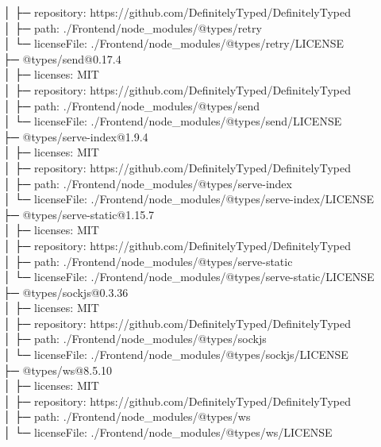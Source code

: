 \documentclass[
    paper=a4,
    twoside=false,
    parskip=half,
    listof=entryprefix,
    listof=totoc,
    index=totoc,
    bibliography=totoc,
    headsepline,
]{scrbook}
\begin{document}
    │  ├─ repository: https://github.com/DefinitelyTyped/DefinitelyTyped\\
    │  ├─ path: ./Frontend/node\_modules/@types/retry\\
    │  └─ licenseFile: ./Frontend/node\_modules/@types/retry/LICENSE\\
    ├─ @types/send@0.17.4\\
    │  ├─ licenses: MIT\\
    │  ├─ repository: https://github.com/DefinitelyTyped/DefinitelyTyped\\
    │  ├─ path: ./Frontend/node\_modules/@types/send\\
    │  └─ licenseFile: ./Frontend/node\_modules/@types/send/LICENSE\\
    ├─ @types/serve-index@1.9.4\\
    │  ├─ licenses: MIT\\
    │  ├─ repository: https://github.com/DefinitelyTyped/DefinitelyTyped\\
    │  ├─ path: ./Frontend/node\_modules/@types/serve-index\\
    │  └─ licenseFile: ./Frontend/node\_modules/@types/serve-index/LICENSE\\
    ├─ @types/serve-static@1.15.7\\
    │  ├─ licenses: MIT\\
    │  ├─ repository: https://github.com/DefinitelyTyped/DefinitelyTyped\\
    │  ├─ path: ./Frontend/node\_modules/@types/serve-static\\
    │  └─ licenseFile: ./Frontend/node\_modules/@types/serve-static/LICENSE\\
    ├─ @types/sockjs@0.3.36\\
    │  ├─ licenses: MIT\\
    │  ├─ repository: https://github.com/DefinitelyTyped/DefinitelyTyped\\
    │  ├─ path: ./Frontend/node\_modules/@types/sockjs\\
    │  └─ licenseFile: ./Frontend/node\_modules/@types/sockjs/LICENSE\\
    ├─ @types/ws@8.5.10\\
    │  ├─ licenses: MIT\\
    │  ├─ repository: https://github.com/DefinitelyTyped/DefinitelyTyped\\
    │  ├─ path: ./Frontend/node\_modules/@types/ws\\
    │  └─ licenseFile: ./Frontend/node\_modules/@types/ws/LICENSE\\
\end{document}

